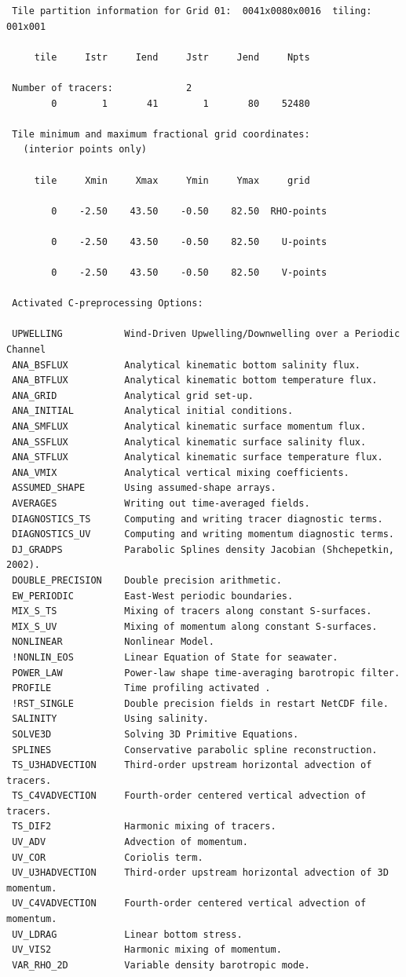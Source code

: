 \begin{verbatim}
 Tile partition information for Grid 01:  0041x0080x0016  tiling: 001x001

     tile     Istr     Iend     Jstr     Jend     Npts

 Number of tracers:             2
        0        1       41        1       80    52480

 Tile minimum and maximum fractional grid coordinates:
   (interior points only)

     tile     Xmin     Xmax     Ymin     Ymax     grid

        0    -2.50    43.50    -0.50    82.50  RHO-points

        0    -2.50    43.50    -0.50    82.50    U-points

        0    -2.50    43.50    -0.50    82.50    V-points

 Activated C-preprocessing Options:

 UPWELLING           Wind-Driven Upwelling/Downwelling over a Periodic Channel
 ANA_BSFLUX          Analytical kinematic bottom salinity flux.
 ANA_BTFLUX          Analytical kinematic bottom temperature flux.
 ANA_GRID            Analytical grid set-up.
 ANA_INITIAL         Analytical initial conditions.
 ANA_SMFLUX          Analytical kinematic surface momentum flux.
 ANA_SSFLUX          Analytical kinematic surface salinity flux.
 ANA_STFLUX          Analytical kinematic surface temperature flux.
 ANA_VMIX            Analytical vertical mixing coefficients.
 ASSUMED_SHAPE       Using assumed-shape arrays.
 AVERAGES            Writing out time-averaged fields.
 DIAGNOSTICS_TS      Computing and writing tracer diagnostic terms.
 DIAGNOSTICS_UV      Computing and writing momentum diagnostic terms.
 DJ_GRADPS           Parabolic Splines density Jacobian (Shchepetkin, 2002).
 DOUBLE_PRECISION    Double precision arithmetic.
 EW_PERIODIC         East-West periodic boundaries.
 MIX_S_TS            Mixing of tracers along constant S-surfaces.
 MIX_S_UV            Mixing of momentum along constant S-surfaces.
 NONLINEAR           Nonlinear Model.
 !NONLIN_EOS         Linear Equation of State for seawater.
 POWER_LAW           Power-law shape time-averaging barotropic filter.
 PROFILE             Time profiling activated .
 !RST_SINGLE         Double precision fields in restart NetCDF file.
 SALINITY            Using salinity.
 SOLVE3D             Solving 3D Primitive Equations.
 SPLINES             Conservative parabolic spline reconstruction.
 TS_U3HADVECTION     Third-order upstream horizontal advection of tracers.
 TS_C4VADVECTION     Fourth-order centered vertical advection of tracers.
 TS_DIF2             Harmonic mixing of tracers.
 UV_ADV              Advection of momentum.
 UV_COR              Coriolis term.
 UV_U3HADVECTION     Third-order upstream horizontal advection of 3D momentum.
 UV_C4VADVECTION     Fourth-order centered vertical advection of momentum.
 UV_LDRAG            Linear bottom stress.
 UV_VIS2             Harmonic mixing of momentum.
 VAR_RHO_2D          Variable density barotropic mode.


\end{verbatim}
